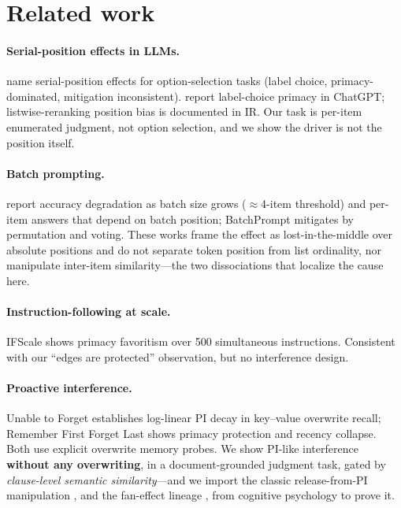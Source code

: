 \section{Related work}

\paragraph{Serial-position effects in LLMs.}
\citet{guo2024serial} name serial-position effects for option-selection tasks (label choice,
primacy-dominated, mitigation inconsistent). \citet{wang2023primacy} report label-choice primacy in ChatGPT;
listwise-reranking position bias is documented in IR. Our task is per-item enumerated judgment, not option
selection, and we show the driver is not the position itself.

\paragraph{Batch prompting.}
\citet{cheng2023batch} report accuracy degradation as batch size grows ($\approx$4-item threshold) and per-item
answers that depend on batch position; BatchPrompt \citep{lin2023batchprompt} mitigates by permutation and
voting. These works frame the effect as lost-in-the-middle over absolute positions \citep{liu2023lost} and do
not separate token position from list ordinality, nor manipulate inter-item similarity---the two dissociations
that localize the cause here.

\paragraph{Instruction-following at scale.}
IFScale \citep{jaroslawicz2025ifscale} shows primacy favoritism over 500 simultaneous instructions. Consistent
with our ``edges are protected'' observation, but no interference design.

\paragraph{Proactive interference.}
Unable to Forget \citep{wang2025unable} establishes log-linear PI decay in key--value overwrite recall;
Remember First Forget Last \citep{rffl2026} shows primacy protection and recency collapse. Both use explicit
overwrite memory probes. We show PI-like interference \textbf{without any overwriting}, in a document-grounded
judgment task, gated by \emph{clause-level semantic similarity}---and we import the classic release-from-PI
manipulation \citep{watkins1975cue}, and the fan-effect lineage \citep{anderson1974fan}, from cognitive
psychology to prove it.

